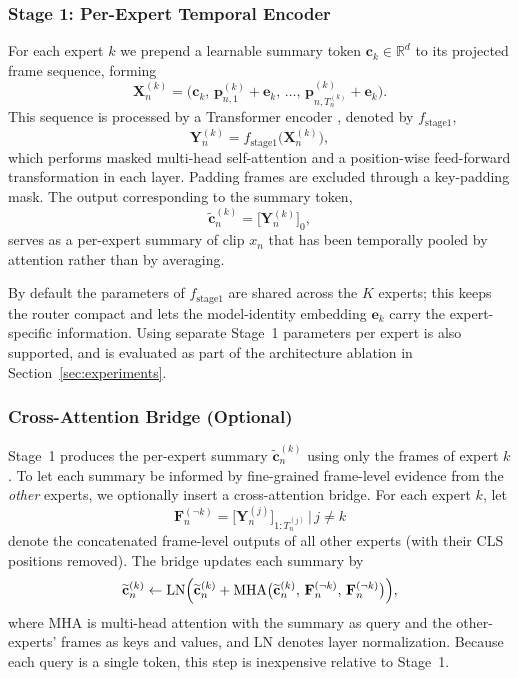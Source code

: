\documentclass[journal]{IEEEtran}
\begin{document}
\subsubsection{Stage 1: Per-Expert Temporal Encoder}

For each expert $k$ we prepend a learnable summary token
$\mathbf{c}_k\in\mathbb{R}^{d}$ to its projected frame sequence,
forming
\[
\mathbf{X}_n^{(k)} =
\bigl(\mathbf{c}_k,\,\mathbf{p}_{n,1}^{(k)}+\mathbf{e}_k,\,\dots,\,
\mathbf{p}_{n,T_n^{(k)}}^{(k)}+\mathbf{e}_k\bigr).
\]
This sequence is processed by a Transformer encoder
\cite{vaswani2017attention}, denoted by $f_{\text{stage1}}$,
\begin{equation}
\mathbf{Y}_n^{(k)} = f_{\text{stage1}}\bigl(\mathbf{X}_n^{(k)}\bigr),
\label{eq:stage1}
\end{equation}
which performs masked multi-head self-attention and a position-wise
feed-forward transformation in each layer. Padding frames are excluded
through a key-padding mask. The output corresponding to the summary
token,
\[
\widetilde{\mathbf{c}}_n^{(k)} = \bigl[\mathbf{Y}_n^{(k)}\bigr]_{0},
\]
serves as a per-expert summary of clip $x_n$ that has been
temporally pooled by attention rather than by averaging.

By default the parameters of $f_{\text{stage1}}$ are shared across the
$K$ experts; this keeps the router compact and lets the model-identity
embedding $\mathbf{e}_k$ carry the expert-specific information. Using
separate Stage~1 parameters per expert is also supported, and is
evaluated as part of the architecture ablation in
Section~\ref{sec:experiments}.

\subsubsection{Cross-Attention Bridge (Optional)}

Stage~1 produces the per-expert summary $\widetilde{\mathbf{c}}_n^{(k)}$
using only the frames of expert $k$. To let each summary be informed
by fine-grained frame-level evidence from the \emph{other} experts,
we optionally insert a cross-attention bridge. For each expert $k$,
let
\[
\mathbf{F}_n^{(\neg k)} = \bigl[\mathbf{Y}_n^{(j)}\bigr]_{1{:}T_n^{(j)}}\,\big|\,j\neq k
\]
denote the concatenated frame-level outputs of all other experts (with
their CLS positions removed). The bridge updates each summary by
\begin{equation}
\widetilde{\mathbf{c}}_n^{(k)} \leftarrow
\mathrm{LN}\Bigl(
\widetilde{\mathbf{c}}_n^{(k)}
+ \mathrm{MHA}\bigl(
\widetilde{\mathbf{c}}_n^{(k)},\,\mathbf{F}_n^{(\neg k)},\,\mathbf{F}_n^{(\neg k)}
\bigr)
\Bigr),
\label{eq:bridge}
\end{equation}
where $\mathrm{MHA}$ is multi-head attention with the summary as
query and the other-experts' frames as keys and values, and
$\mathrm{LN}$ denotes layer normalization. Because each query is a
single token, this step is inexpensive relative to Stage~1.
\end{document}
